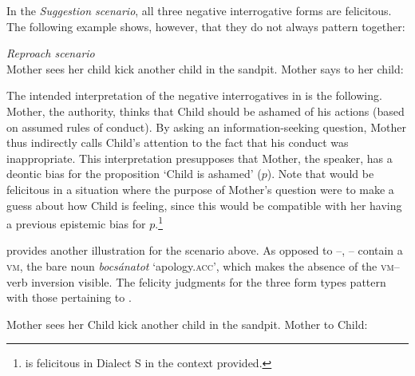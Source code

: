 \documentclass[output=paper,colorlinks,citecolor=brown]{langscibook}
\begin{document}
	\noindent In the \textit{Suggestion scenario}, all  three negative interrogative forms are felicitous. The following example shows, however, that they do not always pattern together:
	
	\ea\label{ex:mother}
	\textit{Reproach scenario}\\
	Mother sees her child kick another child in the sandpit. Mother says to her child:
	\label{ex:mothera}
	\label{ex:motherb}
	\label{ex:motherc}
	\z
	\z
	

	\noindent The  intended interpretation of the negative interrogatives in  is the following. Mother, the authority, thinks that Child should be ashamed of his actions (based on assumed rules of conduct). By asking an information-seeking question, Mother thus indirectly calls Child's attention to the fact that his conduct was inappropriate. This interpretation presupposes that Mother, the speaker, has a deontic bias for  the proposition `Child is ashamed' ($p$). Note that  would be felicitous in a situation where the purpose of Mother's question were to make a guess about how Child is feeling, since this would be compatible with her having a previous epistemic bias for $p$.\footnote{ is felicitous in Dialect S in the context provided.}

	 provides another illustration for the scenario above.  As opposed to  --, -- contain  a \textsc{vm}, the bare noun \textit{bocsánatot} `apology.\textsc{acc}', which makes the absence of the \textsc{vm}--verb inversion  visible. The felicity judgments for the three form types pattern with those  pertaining to .
	
	\ea\label{ex:bocsanat}
	Mother sees her Child kick another child in the sandpit. Mother to Child:
	\label{ex:bocsanata}
	\label{ex:bocsanatb}
	\label{ex:bocsanatc}
	\z
	\z
	
\end{document}
